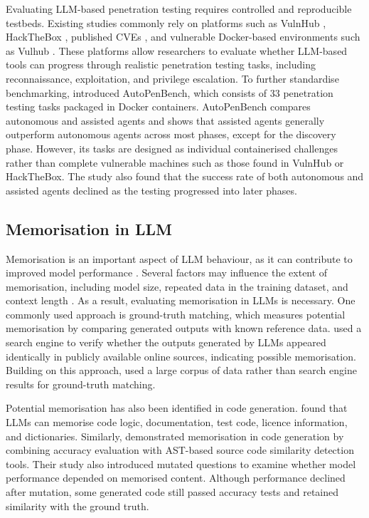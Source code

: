 \documentclass[acmtog]{acmart}
\begin{document}
Evaluating LLM-based penetration testing requires controlled and reproducible testbeds. Existing studies commonly rely on platforms such as VulnHub \cite{vulnhubVulnerableDesign}, HackTheBox \cite{hacktheboxHackBox}, published CVEs \cite{cve}, and vulnerable Docker-based environments such as Vulhub \cite{vulhubVulhubOpenSource}. These platforms allow researchers to evaluate whether LLM-based tools can progress through realistic penetration testing tasks, including reconnaissance, exploitation, and privilege escalation. To further standardise benchmarking, \citet{gioacchini_autopenbench_2024} introduced AutoPenBench, which consists of 33 penetration testing tasks packaged in Docker containers. AutoPenBench compares autonomous and assisted agents and shows that assisted agents generally outperform autonomous agents across most phases, except for the discovery phase. However, its tasks are designed as individual containerised challenges rather than complete vulnerable machines such as those found in VulnHub or HackTheBox. The study also found that the success rate of both autonomous and assisted agents declined as the testing progressed into later phases.

\subsection{Memorisation in LLM}
Memorisation is an important aspect of LLM behaviour, as it can contribute to improved model performance \cite{hartmann_sok_2023}. Several factors may influence the extent of memorisation, including model size, repeated data in the training dataset, and context length \cite{carlini2023quantifyingmemorizationneurallanguage}. As a result, evaluating memorisation in LLMs is necessary. One commonly used approach is ground-truth matching, which measures potential memorisation by comparing generated outputs with known reference data. \citet{carlini_extracting_2021} used a search engine to verify whether the outputs generated by LLMs appeared identically in publicly available online sources, indicating possible memorisation. Building on this approach, \cite{nasr_scalable_2023} used a large corpus of data rather than search engine results for ground-truth matching.

Potential memorisation has also been identified in code generation. \citet{al_traces} found that LLMs can memorise code logic, documentation, test code, licence information, and dictionaries. Similarly, \citet{chen_memorize_2025} demonstrated memorisation in code generation by combining accuracy evaluation with AST-based source code similarity detection tools. Their study also introduced mutated questions to examine whether model performance depended on memorised content. Although performance declined after mutation, some generated code still passed accuracy tests and retained similarity with the ground truth.
\end{document}
